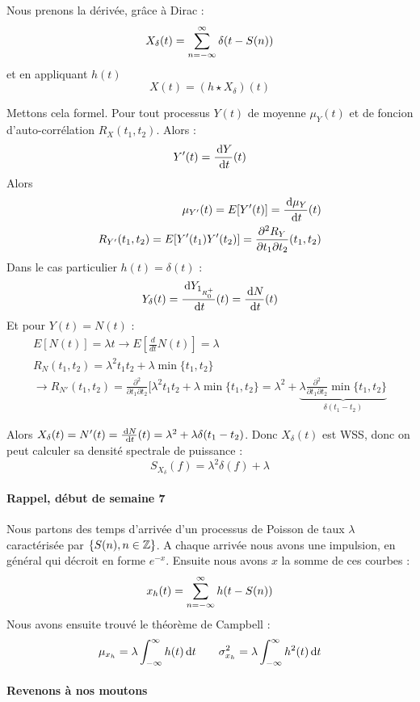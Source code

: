 \documentclass[11pt,a4paper]{article}
\numberwithin{equation}{section}
\begin{document}
Nous prenons la dérivée, grâce à Dirac :
\[X_{\delta}(t) = \sum\limits_{n=-\infty}^{\infty} \delta(t-S(n))\]
et en appliquant $h(t)$
\[X(t) = (h \star X_\delta)(t)\]

Mettons cela formel. Pour tout processus $Y(t)$ de moyenne $\mu_Y(t)$ et de foncion d'auto-corrélation $R_X(t_1,t_2)$. Alors :
\[Y'(t) = \frac{\, \mathrm d Y}{\, \mathrm d t}(t)\]
Alors
\begin{align*}
    \mu_{Y'}(t) = E[Y'(t)] = \frac{\, \mathrm d \mu_Y}{\, \mathrm d t}(t)\\
    R_{Y'}(t_1,t_2) = E[Y'(t_1)Y'(t_2)] = \frac{\partial^2 R_Y}{\partial t_1 \partial t_2}(t_1,t_2)
\end{align*}
Dans le cas particulier $h(t) = \delta(t)$ :
\[Y_\delta(t) = \frac{\, \mathrm d Y_{1_{R_0^+}}}{\, \mathrm d t}(t) = \frac{\, \mathrm d N}{\, \mathrm d t}(t)\]
Et pour $Y(t) = N(t)$ :
\begin{align*}
    E[N(t)] = \lambda t \to E[\frac{d}{dt}N(t)] = \lambda\\
    R_N(t_1,t_2) = \lambda^2 t_1t_2 + \lambda \min\{t_1,t_2\}\\
     \to R_{N'}(t_1,t_2) = \frac{\partial^2}{\partial t_1 \partial t_2}[\lambda^2 t_1t_2 + \lambda \min\{t_1,t_2\} = \lambda^2 + \underbrace{\lambda \frac{\partial^2}{\partial t_1 \partial t_2} \min\{t_1,t_2\}}_{\delta(t_1-t_2)}
\end{align*}

Alors $X_\delta(t) = N'(t) = \frac{\, \mathrm d N}{\, \mathrm d t}(t) = \lambda^2 +\lambda\delta(t_1-t_2)$. Donc $X_\delta(t)$ est WSS, donc on peut calculer sa densité spectrale de puissance :
\[S_{X_\delta}(f) = \lambda^2\delta(f) + \lambda\]

\paragraph{Rappel, début de semaine 7}
Nous partons des temps d'arrivée d'un processus de Poisson de taux $\lambda$ caractérisée par $\{S(n), n \in \mathbb{Z}\}$. A chaque arrivée nous avons une impulsion, en général qui décroit en forme $e^{-x}$. Ensuite nous avons $x$ la somme de ces courbes :
\[x_h(t) = \sum\limits_{n=-\infty}^{\infty} h(t-S(n))\]
Nous avons ensuite trouvé le théorème de Campbell :
\[\mu_{x_h} = \lambda \int_{-\infty}^{\infty} h(t) \, \mathrm d t \qquad \sigma^2_{x_h} = \lambda \int_{-\infty}^{\infty} h^2(t) \, \mathrm d t\]
\paragraph{Revenons à nos moutons}
\end{document}
